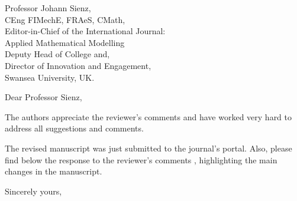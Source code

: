 \documentclass[11pt]{letter} %
\begin{document}

\begin{letter}{Professor Johann Sienz, \\CEng FIMechE, FRAeS, CMath, \\Editor-in-Chief of the International Journal: \\Applied Mathematical Modelling \\Deputy Head of College and, \\Director of Innovation and Engagement, \\
Swansea University, UK.}






\opening{Dear Professor Sienz,} 
 
The authors appreciate the reviewer's comments and have worked very hard to address all suggestions and comments.

The revised manuscript was just submitted to the journal's portal. Also, please find below the response to the reviewer's comments , highlighting the main changes in the manuscript.

\closing{Sincerely yours,}



\end{letter}
\end{document}
